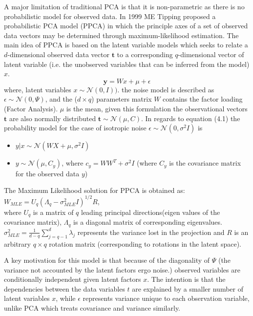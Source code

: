 \documentclass[authoryear,preprint,revi	ew,12pt]{elsarticle}
\begin{document}
 A major limitation of traditional PCA is that it is non-parametric as there is no probabilistic model for observed data. In 1999 ME Tipping \citep*{tipping1999mixtures} proposed a probabilistic PCA model (PPCA) in which the principle axes of a set of observed data vectors may be determined through maximum-likelihood estimation. The main idea of PPCA is based on the latent variable models which seeks to relate a $ d $-dimensional observed data vector $ \mathbf{t} $ to a corresponding $ q $-dimensional vector of latent variable (i.e. the unobserved variables that can be inferred from the model) $ x $.
\begin{equation}
\mathbf{y} = Wx + \mu + \epsilon
\end{equation} 
where, latent variables $ x \sim \mathcal{N}(0,I)) $. the noise model is described as $ \epsilon \sim \mathcal{N}(0,\Psi) $, and the ($ d \times q $) parameters matrix $ W $ contains the factor loading (Factor Analysis). $ \mu $ is the mean, given this formulation the observational vectors $ \mathbf{t} $ are also normally distributed $ \mathbf{t} \sim \mathcal{N}(\mu,C) $. In regards to equation (4.1) the probability model for the case of isotropic noise $ \epsilon \sim \mathcal{N}(0,\sigma^2I) $ is 
\begin{itemize}
	\item $ y|x \sim \mathcal{N}(WX + \mu, \sigma^2I) $
	\item $ y \sim \mathcal{N}(\mu, C_y) $, where $ c_y = WW^T + \sigma^2I $ (where $C_y$ is the covariance matrix for the observed data $ y $)
\end{itemize}
The Maximum Likelihood solution for PPCA is obtained as: \\$W_{MLE} = U_q(\Lambda_q - \sigma_{MLE}^2I)^{1/2}R$, \\where $U_q$ is a matrix of $q$ leading principal directions(eigen values of the covariance matrix), $\Lambda_q$ is a diagonal matrix of corresponding eigenvalues. \\$\sigma_{MLE}^2 = \frac{1}{d-q}\sum_{j=q-1}^{d}\lambda_j$ represents the variance lost in the projection and $R$ is an arbitrary $q\times q$ rotation matrix (corresponding to rotations in the latent space). 

A key motivation for this model is that because of the diagonality of $ \Psi $ (the variance not accounted by the latent factors ergo noise.) observed variables are conditionally independent given latent factors $ x $. The intention is that the dependencies between the data variables $t$ are explained by a smaller number of latent variables $x$, while $ \epsilon $ 
represents variance unique to
each observation variable, unlike PCA which treats covariance and variance similarly. 
\end{document}

